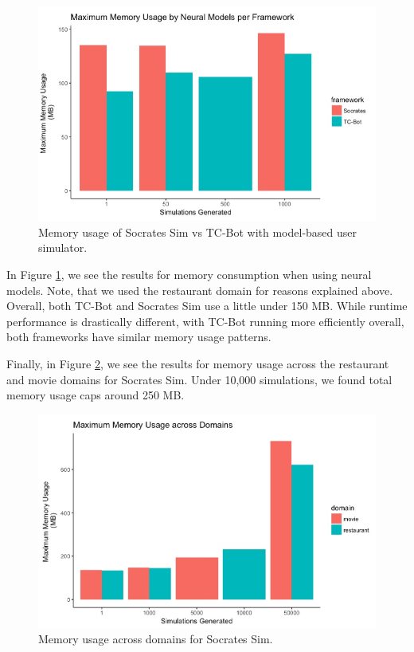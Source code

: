 \begin{figure}[h!]
		\centering
	\label{fig:mem_usage_nm}
	\includegraphics[width=\linewidth]{diagrams/mem_usage_neural.jpeg}
	\caption{ Memory usage of Socrates Sim vs TC-Bot with model-based user simulator. }
\end{figure}

In Figure \ref{fig:mem_usage_nm}, we see the results for memory consumption when using neural models. Note, that we used the restaurant domain for reasons explained above. Overall, both TC-Bot and Socrates Sim use a little under 150 MB. While runtime performance is drastically different, with TC-Bot running more efficiently overall, both frameworks have similar memory usage patterns. 

Finally, in Figure \ref{fig:mem_usage_cd}, we see the results for memory usage across the restaurant and movie domains for Socrates Sim. Under 10,000 simulations, we found total memory usage caps around 250 MB. 

\begin{figure}[h!]
		\centering
	\label{fig:mem_usage_cd}
	\includegraphics[width=\linewidth]{diagrams/mem_usage_domains.jpeg}
	\caption{ Memory usage across domains for Socrates Sim.}
\end{figure}

